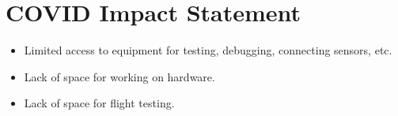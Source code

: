 

\chapter*{COVID Impact Statement}\label{COVIDStatement}

\begin{itemize}
  \item Limited access to equipment for testing, debugging, connecting sensors, etc.
  \item Lack of space for working on hardware.
  \item Lack of space for flight testing.
\end{itemize}

\clearpage


